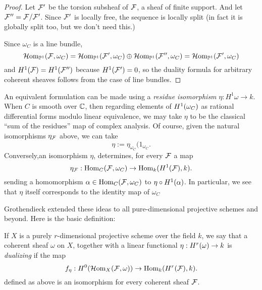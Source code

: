 \begin{proof}
 Let $\cF'$ be the torsion subsheaf  of $\cF$, a sheaf of finite support. And let
 $\cF'' = \cF/\cF'$.
 Since
$\cF'$ is locally free, the sequence is locally split (in fact it is globally split too, but we don't need this.)

Since $\omega_{C}$ is a line bundle, 
$$
\sHom_{\PP^1}(\sF, \omega_{C}) = 
\sHom_{\PP^1}(\sF', \omega_{C}) \oplus \sHom_{\PP^1}(\sF'', \omega_{C})  = 
\sHom_{\PP^1}(\sF', \omega_{C}) 
$$
and 
$\HH^{1}(\cF) = \HH^{1}(\cF'')
$
because $\HH^{1}(\cF') = 0$, so the duality formula for arbitrary coherent sheaves follows from the case of line bundles.
\end{proof}

An equivalent formulation can be made using a \emph{residue isomorphism} $\eta: H^{1}\omega \to k$. When $C$ is smooth over $\CC$, then regarding elements of 
$\HH^{1}(\omega_{C})$ as rational differential forms modulo linear equivalence,
we may take $\eta$ to be the classical ``sum of the residues'' map of complex analysis.
Of course, given the natural isomorphisms $\eta_{\sF}$ above, we can take
$$
\eta := \eta_{\omega_{C}}(1_{\omega_{C}}.
$$ Conversely,an isomorphism $\eta$, 
determines, for every $\sF$ a map
$$
\eta_{\sF}:\Hom_{C}(\sF, \omega_{C})
\to
\Hom_{k}(\HH^{1}(\cF), k).
$$
sending a homomorphism
$\alpha \in \Hom_{C}(\sF, \omega_{C}) $
to $\eta \circ \HH^{1}(\alpha)$. In particular, we see that $\eta$ itself corresponds to the 
identity map of $\omega_{C}$  

%

Grothendieck extended these ideas to all pure-dimensional projective schemes and beyond. Here is the basic definition:

\begin{definition}
If $X$ is a purely $r$-dimensional projective scheme over the field $k$, we say that a coherent sheaf $\omega$ on $X$, together with a linear
functional $\eta:\HH^{r}(\omega) \to k$ is \emph{dualizing} if the map
$$
f_{\eta}: \HH^{0}(\sHom_{X}(\sF, \omega))
\to
\Hom_{k}(\HH^{r}(\cF), k).
$$
defined as above is an isomorphism for every coherent sheaf $\sF$.
\end{definition}


